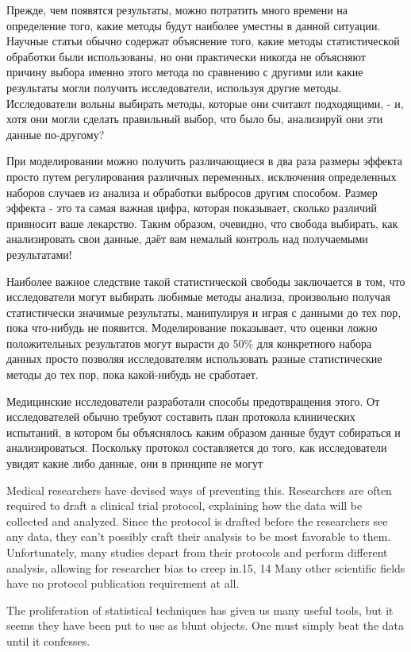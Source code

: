 Прежде, чем появятся результаты, можно потратить много времени на определение того, какие методы будут наиболее уместны в данной ситуации. Научные статьи обычно содержат объяснение того, какие методы статистической обработки были использованы, но они практически никогда не объясняют причину выбора именно этого метода по сравнению с другими или какие результаты могли получить исследователи, используя другие методы. Исследователи вольны выбирать методы, которые они считают подходящими, - и, хотя они могли сделать правильный выбор, что было бы, анализируй они эти данные по-другому?    

При моделировании можно получить различающиеся в два раза размеры эффекта просто путем регулирования различных переменных, исключения определенных наборов случаев из анализа и обработки выбросов другим способом. \cite{ioannidis_why_2008} Размер эффекта - это та самая важная цифра, которая показывает, сколько различий привносит ваше лекарство. Таким образом, очевидно, что свобода выбирать, как анализировать свои данные, даёт вам немалый контроль над получаемыми результатами!  

Наиболее важное следствие такой статистической свободы заключается в том, что исследователи могут выбирать любимые методы анализа, произвольно получая статистически значимые результаты, манипулируя и играя с данными до тех пор, пока что-нибудь не появится. Моделирование показывает, что оценки ложно положительных результатов могут вырасти до 50\% для конкретного набора данных просто позволяя исследователям использовать разные статистические методы до тех пор, пока какой-нибудь не сработает. \cite{simmons_false-positive_2011}

Медицинские исследователи разработали способы предотвращения этого. От исследователей обычно требуют составить план протокола клинических испытаний, в котором бы объяснялось каким образом данные будут собираться и анализироваться. Поскольку протокол составляется до того, как исследователи увидят какие либо данные, они в принципе не могут 

Medical researchers have devised ways of preventing this. Researchers are often required to draft a clinical trial protocol, explaining how the data will be collected and analyzed. Since the protocol is drafted before the researchers see any data, they can’t possibly craft their analysis to be most favorable to them. Unfortunately, many studies depart from their protocols and perform different analysis, allowing for researcher bias to creep in.15, 14 Many other scientific fields have no protocol publication requirement at all.

The proliferation of statistical techniques has given us many useful tools, but it seems they have been put to use as blunt objects. One must simply beat the data until it confesses.